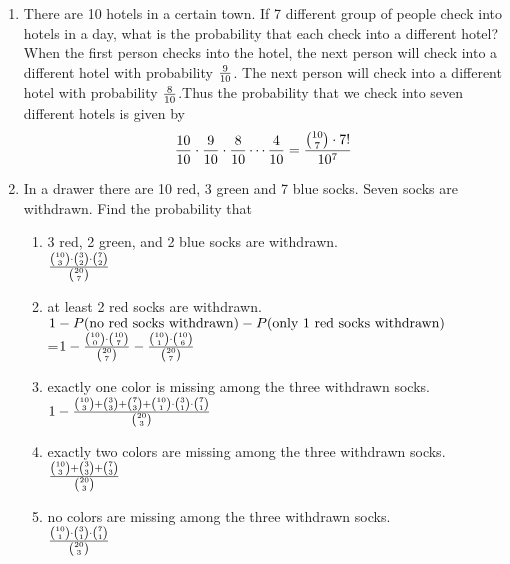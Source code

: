 \documentclass[12pt]{article}%
\newcommand{\0}{{\bf 0}}
\begin{document}
\begin{enumerate}
\item 
There are 10 hotels in a certain town. 
If 7 different group of people check into hotels in a day, 
what is the probability that each check into a different hotel? 
\\
{\color{blue}{\bf Sol.}}
When the first person checks into the hotel, the next person will check into a different hotel with probability $\frac{9}{10}$. The next person will check into a different hotel with probability $\frac{8}{10}$.Thus the probability that we check into seven different hotels is given by
$$\frac{10}{10} \cdot \frac{9}{10} \cdot \frac{8}{10} \cdots \frac{4}{10}=\frac{{10 \choose 7}\cdot7!}{10^7}$$




\item
In a drawer there are 10 red, 3 green and 7 blue socks.
Seven socks are withdrawn. 
Find the probability that 
\begin{enumerate}
\item 3 red, 2 green, and 2 blue socks are withdrawn.
\\
{\color{blue}{\bf Sol.}}
$\frac{{10 \choose 3}\cdot{3 \choose 2}\cdot{7 \choose 2}}{{20 \choose 7}}$  
\item at least 2 red socks are withdrawn.
\\
{\color{blue}{\bf Sol.}}
$1-P(\mbox{no red socks withdrawn})-P(\mbox{only 1 red socks withdrawn})$\\
=$1-\frac{{10 \choose 0}\cdot{10 \choose 7}}{{20 \choose 7}}-\frac{{10 \choose 1}\cdot{10 \choose 6}}{{20 \choose 7}}$
\item exactly one color is missing among the three withdrawn socks.
\\
{\color{blue}{\bf Sol.}}
$1-\frac{{10 \choose 3}+{3 \choose 3}+{7 \choose 3}+{10 \choose 1}\cdot{3 \choose 1}\cdot{7 \choose 1}}{{20 \choose 3}}$
\item exactly two colors are missing among the three withdrawn socks.
\\
{\color{blue}{\bf Sol.}}
$\frac{{10 \choose 3}+{3 \choose 3}+{7 \choose 3}}{{20 \choose 3}}$
\item no colors are missing among the three withdrawn socks.
\\
{\color{blue}{\bf Sol.}}
$\frac{{10 \choose 1}\cdot{3 \choose 1}\cdot{7 \choose 1}}{{20 \choose 3}}$
\end{enumerate}












\end{enumerate}
\end{document}
